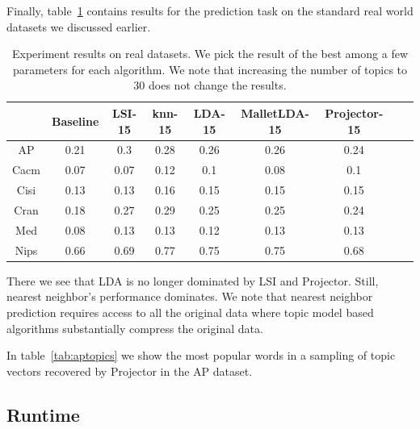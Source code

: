 Finally, table~\ref{tab:real} contains results for the prediction
task on the standard real world datasets we discussed earlier.

\begin{table}[ht]
{\small
\begin{center}
\begin{tabular}{|c|c|c|c|c|c|c|c|c|}
\hline 
 &Baseline &LSI-15 &knn-15 &LDA-15 &MalletLDA-15 &Projector-15 \\
 \hline 
AP &0.21 &0.3 &0.28 &0.26 &0.26 &0.24 \\
 \hline 
Cacm &0.07 &0.07 &0.12 &0.1 &0.08 &0.1 \\
 \hline 
Cisi &0.13 &0.13 &0.16 &0.15 &0.15 &0.15 \\
 \hline 
Cran &0.18 &0.27 &0.29 &0.25 &0.25 &0.24 \\
 \hline 
Med &0.08 &0.13 &0.13 &0.12 &0.13 &0.13 \\
 \hline 
Nips &0.66 &0.69 &0.77 &0.75 &0.75 &0.68 \\
 \hline 

\end{tabular}
\end{center}
}
\caption{Experiment results on real datasets. We pick the result of the best among a few parameters for each algorithm. We note that increasing the number of topics to 30 does not change the results. }
\label{tab:real}
\end{table}


There we see that LDA is no longer dominated by LSI and Projector.
Still, nearest neighbor's performance dominates. We note that nearest
neighbor prediction requires access to all the original data where topic
model based algorithms substantially compress the original data. 

In table~\ref{tab:aptopics} we show the most popular words in a
sampling of topic vectors recovered by Projector in the AP dataset.




\subsection{Runtime}

